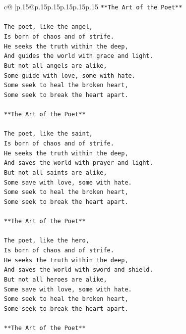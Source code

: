 \documentclass{article}
\begin{document}
{\begin{supertabular}{c@{$\;$}|p{.15\linewidth}@{}p{.15\linewidth}p{.15\linewidth}p{.15\linewidth}p{.15\linewidth}p{.15\linewidth}}
{{{\texttt{**The Art of the Poet**} \\
\\ 
\texttt{The poet, like the angel,} \\
\texttt{Is born of chaos and of strife.} \\
\texttt{He seeks the truth within the deep,} \\
\texttt{And guides the world with grace and light.} \\
\texttt{But not all angels are alike,} \\
\texttt{Some guide with love, some with hate.} \\
\texttt{Some seek to heal the broken heart,} \\
\texttt{Some seek to break the heart apart.} \\
\\ 
\texttt{**The Art of the Poet**} \\
\\ 
\texttt{The poet, like the saint,} \\
\texttt{Is born of chaos and of strife.} \\
\texttt{He seeks the truth within the deep,} \\
\texttt{And saves the world with prayer and light.} \\
\texttt{But not all saints are alike,} \\
\texttt{Some save with love, some with hate.} \\
\texttt{Some seek to heal the broken heart,} \\
\texttt{Some seek to break the heart apart.} \\
\\ 
\texttt{**The Art of the Poet**} \\
\\ 
\texttt{The poet, like the hero,} \\
\texttt{Is born of chaos and of strife.} \\
\texttt{He seeks the truth within the deep,} \\
\texttt{And saves the world with sword and shield.} \\
\texttt{But not all heroes are alike,} \\
\texttt{Some save with love, some with hate.} \\
\texttt{Some seek to heal the broken heart,} \\
\texttt{Some seek to break the heart apart.} \\
\\ 
\texttt{**The Art of the Poet**} \\
}}}
\end{supertabular}}
\end{document}

